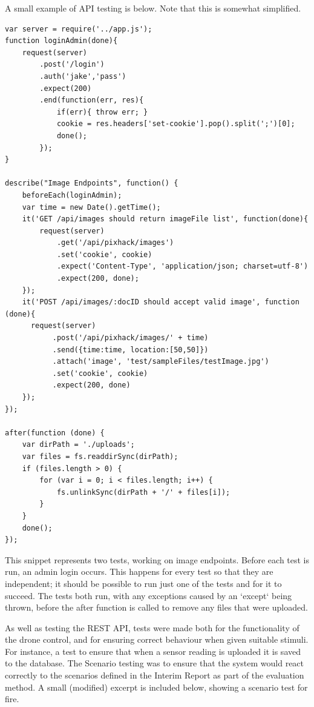 \documentclass{article}
\begin{document}
A small example of API testing is below. Note that this is somewhat simplified.

\begin{lstlisting}
var server = require('../app.js');
function loginAdmin(done){
	request(server)
		.post('/login')
		.auth('jake','pass')
		.expect(200)
		.end(function(err, res){
			if(err){ throw err; }
			cookie = res.headers['set-cookie'].pop().split(';')[0];
			done();
		});
}

describe("Image Endpoints", function() {
	beforeEach(loginAdmin); 	
	var time = new Date().getTime();
	it('GET /api/images should return imageFile list', function(done){
		request(server)
			.get('/api/pixhack/images')
			.set('cookie', cookie)
			.expect('Content-Type', 'application/json; charset=utf-8')
			.expect(200, done);
	});
	it('POST /api/images/:docID should accept valid image', function (done){
	  request(server)
		   .post('/api/pixhack/images/' + time)
		   .send({time:time, location:[50,50]})
		   .attach('image', 'test/sampleFiles/testImage.jpg')
		   .set('cookie', cookie)
		   .expect(200, done)
	});
});

after(function (done) {
	var dirPath = './uploads';
	var files = fs.readdirSync(dirPath);
	if (files.length > 0) {
		for (var i = 0; i < files.length; i++) {
			fs.unlinkSync(dirPath + '/' + files[i]);
		}
	}
	done();
});
\end{lstlisting}

This snippet represents two tests, working on image endpoints. Before each test is run, an admin login occurs. This happens for every test so that they are independent; it should be possible to run just one of the tests and for it to succeed. The tests both run, with any exceptions caused by an `except` being thrown, before the after function is called to remove any files that were uploaded.  

As well as testing the REST API, tests were made both for the functionality of the drone control, and for ensuring correct behaviour when given suitable stimuli. For instance, a test to ensure that when a sensor reading is uploaded it is saved to the database. The Scenario testing was to ensure that the system would react correctly to the scenarios defined in the Interim Report as part of the evaluation method. A small (modified) excerpt is included below, showing a scenario test for fire. 
\end{document}
